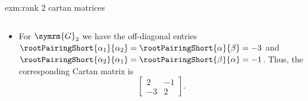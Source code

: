 \documentclass[fleqn]{NotesClass}
\newcommand{\dynkin}[2]{\symrm{#1}_{#2}}
\begin{document}
\begin{exm}{}{exm:rank 2 cartan matrices}
\begin{itemize}
\begin{equation}
            \end{equation}
            \item For \(\dynkin{G}{2}\) we have the off-diagonal entries \(\rootPairingShort{\alpha_1}{\alpha_2} = \rootPairingShort{\alpha}{\beta} = -3\) and \(\rootPairingShort{\alpha_2}{\alpha_1} = \rootPairingShort{\beta}{\alpha} = -1\).
            Thus, the corresponding Cartan matrix is
            \begin{equation}
                \begin{bmatrix}
                    2 & -1\\
                    -3 & 2
                \end{bmatrix}
                .
            \end{equation}
        \end{itemize}
    \end{exm}
    
\end{document}
